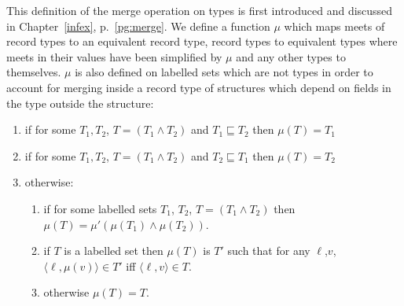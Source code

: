 This definition of the merge operation on types is first introduced
and discussed in Chapter~\ref{infex}, p.~\ref{pg:merge}.
We define a function $\mu$ which maps meets of record types to an
equivalent record type, record types to equivalent types where meets
in their values have been simplified by $\mu$ and any other types to
themselves.  $\mu$ is also defined on labelled sets which are not
types in order to account for merging inside a record type of
structures which depend on fields in the type outside the structure:
\begin{enumerate}
  \item if for some $T_1,T_2$, $T=(T_1\wedge T_2)$ and $T_1\sqsubseteq T_2$
  then $\mu(T)=T_1$ 
 
\item if for some $T_1,T_2$, $T=(T_1\wedge T_2)$ and $T_2\sqsubseteq T_1$
  then $\mu(T)=T_2$
  
\item otherwise:
\begin{enumerate} 
 
\item if for some labelled sets $T_1$, $T_2$, $T=(T_1\wedge T_2)$ then
  $\mu(T)=\mu'(\mu(T_1)\wedge\mu(T_2))$. 
 
\item if $T$ is a labelled set then $\mu(T)$ is $T'$ such that for any
  $\ell$,$v$, $\langle\ell,\mu(v)\rangle\in T'$ iff
  $\langle\ell,v\rangle\in T$.

\item otherwise $\mu(T)=T$.
 
\end{enumerate}
\end{enumerate}

